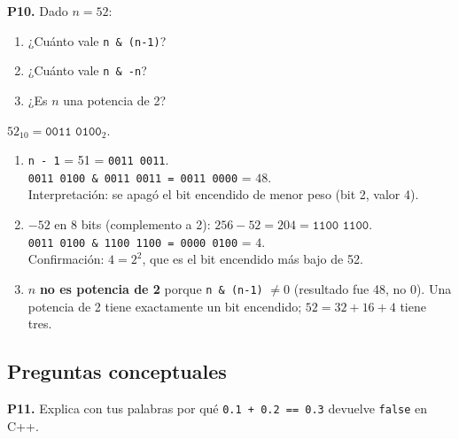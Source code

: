 \documentclass[12pt, oneside]{article}
\begin{document}
\medskip
\textbf{P10.} Dado $n = 52$:
\begin{enumerate}
  \item ¿Cuánto vale \texttt{n \& (n-1)}?
  \item ¿Cuánto vale \texttt{n \& -n}?
  \item ¿Es $n$ una potencia de 2?
\end{enumerate}

\begin{notaprofesor}
  $52_{10} = \texttt{0011 0100}_2$.
  \begin{enumerate}
    \item \texttt{n - 1} = 51 = \texttt{0011 0011}.\\
          \texttt{0011 0100 \& 0011 0011 = 0011 0000} = $48$.\\
          Interpretación: se apagó el bit encendido de menor peso (bit 2, valor 4).
    \item $-52$ en 8 bits (complemento a 2): $256 - 52 = 204 = \texttt{1100 1100}$.\\
          \texttt{0011 0100 \& 1100 1100 = 0000 0100} = $4$.\\
          Confirmación: $4 = 2^2$, que es el bit encendido más bajo de 52.
    \item $n$ \textbf{no es potencia de 2} porque \texttt{n \& (n-1)} $\neq 0$
          (resultado fue 48, no 0).  Una potencia de 2 tiene exactamente un bit
          encendido; $52 = 32 + 16 + 4$ tiene tres.
  \end{enumerate}
\end{notaprofesor}

\subsection{Preguntas conceptuales}

\textbf{P11.} Explica con tus palabras por qué
\texttt{0.1 + 0.2 == 0.3} devuelve \texttt{false} en C++.
\end{document}
